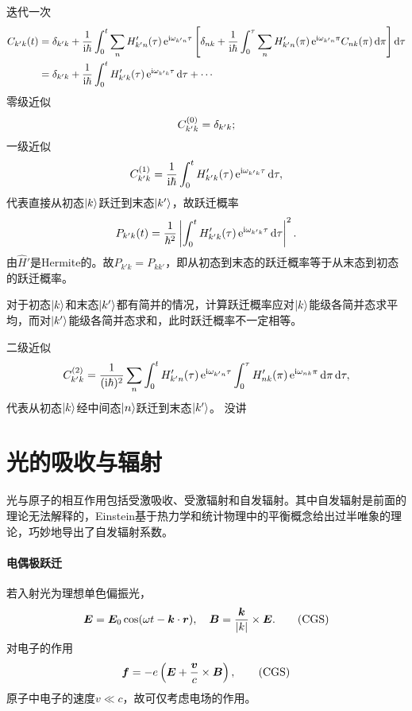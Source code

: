迭代一次
\begin{align*}
	C_{k'k}(t)&=\vd_{k'k}+\frac1{\i\hbar}\int_0^t\sum_nH'_{k'n}(\tau)\e{\i\omega_{k'n}\tau}\fkh{\vd_{nk}+\frac1{\i\hbar}\int_0^\tau\sum_nH'_{k'n}(\pi)\e{\i\omega_{k'n}\pi}C_{nk}(\pi)\d\pi}\d\tau\\
	&=\vd_{k'k}+\frac1{\i\hbar}\int_0^tH'_{k'k}(\tau)\e{\i\omega_{k'k}\tau}\d\tau+\cdots
\end{align*}
零级近似
\[
C_{k'k}^{(0)}=\mathop{}\!\delta_{k'k};
\]
一级近似 
\[
C_{k'k}^{(1)}=\frac1{\mathrm{i}\hbar}\int_0^tH'_{k'k}(\tau)\mathop{}\!\mathrm{e}^{\mathrm{i}\omega_{k'k}\tau}\mathop{}\!\mathrm{d}\tau,
\]
代表直接从初态$\left\vert k\right\rangle$跃迁到末态$\left\vert k'\right\rangle$，故跃迁概率
\begin{align}
	P_{k'k}(t)=\frac1{\hbar^2}\left\lvert\int_0^tH'_{k'k}(\tau)\mathop{}\!\mathrm{e}^{\mathrm{i}\omega_{k'k}\tau}\mathop{}\!\mathrm{d}\tau\right\rvert^2.
\end{align}
由$\hat H'$是Hermite的。故$P_{k'k}=P_{kk'}$，即从初态到末态的跃迁概率等于从末态到初态的跃迁概率。

对于初态$\left\vert k\right\rangle$和末态$\left\vert k'\right\rangle$都有简并的情况，计算跃迁概率应对$\left\vert k\right\rangle$能级各简并态求平均，而对$\left\vert k'\right\rangle$能级各简并态求和，此时跃迁概率不一定相等。

二级近似
\[
C_{k'k}^{(2)}=\frac1{(\mathrm{i}\hbar)^2}\sum_n\int_0^tH'_{k'n}(\tau)\mathop{}\!\mathrm{e}^{\mathrm{i}\omega_{k'n}\tau}\int_0^\tau H'_{nk}(\pi)\mathop{}\!\mathrm{e}^{\mathrm{i}\omega_{nk}\pi}\mathop{}\!\mathrm{d}\pi\mathop{}\!\mathrm{d}\tau,
\]
代表从初态$\left\vert k\right\rangle$经中间态$\left\vert n\right\rangle$跃迁到末态$\left\vert k'\right\rangle$。
没讲
\section{光的吸收与辐射}
光与原子的相互作用包括受激吸收、受激辐射和自发辐射。其中自发辐射是前面的理论无法解释的，Einstein基于热力学和统计物理中的平衡概念给出过半唯象的理论，巧妙地导出了自发辐射系数。
\paragraph{电偶极跃迁}若入射光为理想单色偏振光，
\[
	\bm E=\bm E_0\cos(\omega t-\bm k\cdot\bm r),\quad\bm B=\frac{\bm k}{\abs k}\times\bm E.\CGS
\]
对电子的作用 
\[
	\bm f=-e\kh{\bm E+\frac{\bm v}c\times\bm B},\CGS
\]
原子中电子的速度$v\ll c$，故可仅考虑电场的作用。


